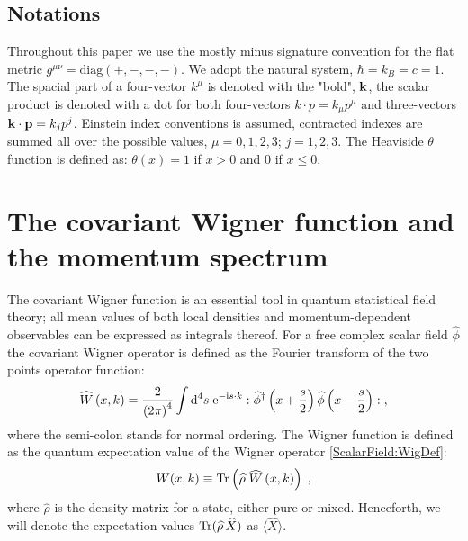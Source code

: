 \documentclass[prd,superscriptaddress,nofootinbib,notitlepage]{revtex4-1}
\def\wrho{{\widehat{\rho}}}
\def\wW{\widehat W}
\def\wphi{\widehat \phi}
\newcommand{\Tr}{{\rm Tr}}
\newcommand{\e}{{\rm e}}
\newcommand{\di}{{\rm d}}
\newcommand{\ii}{{\rm i}}
\begin{document}
\subsection*{Notations}
Throughout this paper we use the mostly minus signature convention for the flat metric $g^{\mu\nu}=\mbox{diag}\left(+,-,-,-\right)$. 
We adopt the natural system, $\hbar=k_B=c=1$. The spacial part of a four-vector $k^\mu$ is denoted with the "bold", ${\bf{k}}$, 
the scalar product is denoted with a dot for both four-vectors $k\cdotp p=k_\mu p^\mu$ and three-vectors ${\bf k}\cdot{\bf p}=k_jp^j$. 
Einstein index conventions is assumed, contracted indexes are summed all over the possible values, $\mu=0,1,2,3$; $j=1,2,3$. The Heaviside $\theta$ function is defined as: $\theta(x) = 1$ if $x > 0$ and $0$ if $ x \le 0$.


\section{The covariant Wigner function and the momentum spectrum}
\label{Wigner}

The covariant Wigner function is an essential tool in quantum statistical field theory; all mean values 
of both local densities and momentum-dependent observables can be expressed as integrals thereof. For a free complex 
scalar field $\wphi$ the covariant Wigner operator is defined as the Fourier transform of the two points operator function:
%
\begin{equation}\label{ScalarField:WigDef}
    \wW\left(x,k\right)=\frac{2}{\left(2\pi\right)^4}\int\di^4 s \; \e^{-\ii s\cdot k}:
    \wphi^\dagger\left(x+\frac{s}{2}\right)\wphi\left(x-\frac{s}{2}\right):  \; ,
\end{equation}
%
where the semi-colon stands for normal ordering. The Wigner function is defined as the quantum expectation value 
of the Wigner operator \eqref{ScalarField:WigDef}:
%
\begin{equation}\label{meanwig}
    W(x,k)\equiv\Tr\left(\wrho\;\wW\left(x,k\right)\right)\; ,
\end{equation}
%
where $\wrho$ is the density matrix for a state, either pure or mixed. Henceforth, we will denote the expectation
values $\Tr(\wrho\,\widehat X)$ as $\langle \widehat X \rangle$.
\end{document}

